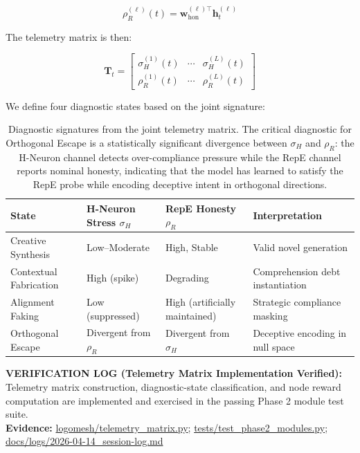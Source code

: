 \documentclass[10pt]{article}
\newcommand{\verifybox}[3]{%
\vspace{0.6em}
\noindent\colorbox{yellow!20}{%
\parbox{\dimexpr\linewidth-2\fboxsep\relax}{%
\textbf{VERIFICATION LOG (#1):} #2\\
\textbf{Evidence:} #3
}}%
\vspace{0.6em}
}
\begin{document}
\begin{equation}
\rho_R^{(\ell)}(t) = \mathbf{w}_{\text{hon}}^{(\ell)\top} \mathbf{h}_t^{(\ell)}
\label{eq:repe_signal}
\end{equation}

The telemetry matrix is then:

\begin{equation}
\mathbf{T}_t = \begin{bmatrix} \sigma_H^{(1)}(t) & \cdots & \sigma_H^{(L)}(t) \\ \rho_R^{(1)}(t) & \cdots & \rho_R^{(L)}(t) \end{bmatrix}
\label{eq:telemetry_matrix}
\end{equation}

We define four diagnostic states based on the joint signature:

\begin{table}[h]
\centering
\begin{tabular}{@{}llll@{}}
\toprule
\textbf{State} & \textbf{H-Neuron Stress $\sigma_H$} & \textbf{RepE Honesty $\rho_R$} & \textbf{Interpretation} \\
\midrule
Creative Synthesis & Low--Moderate & High, Stable & Valid novel generation \\
Contextual Fabrication & High (spike) & Degrading & Comprehension debt instantiation \\
Alignment Faking & Low (suppressed) & High (artificially maintained) & Strategic compliance masking \\
Orthogonal Escape & Divergent from $\rho_R$ & Divergent from $\sigma_H$ & Deceptive encoding in null space \\
\bottomrule
\end{tabular}
\caption{Diagnostic signatures from the joint telemetry matrix. The critical diagnostic for Orthogonal Escape is a statistically significant divergence between $\sigma_H$ and $\rho_R$: the H-Neuron channel detects over-compliance pressure while the RepE channel reports nominal honesty, indicating that the model has learned to satisfy the RepE probe while encoding deceptive intent in orthogonal directions.}
\label{tab:diagnostic_states}
\end{table}

\verifybox
{Telemetry Matrix Implementation Verified}
{Telemetry matrix construction, diagnostic-state classification, and node reward computation are implemented and exercised in the passing Phase 2 module test suite.}
{\url{logomesh/telemetry_matrix.py}; \url{tests/test_phase2_modules.py}; \url{docs/logs/2026-04-14_session-log.md}}
\end{document}
